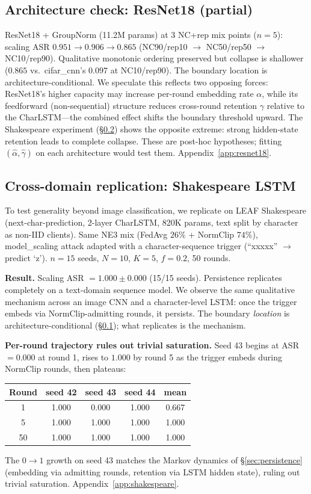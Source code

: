 \documentclass{article}
\begin{document}
\subsection{Architecture check: ResNet18 (partial)}
\label{sec:resnet18}

ResNet18 + GroupNorm (11.2M params) at 3 NC+rep mix points ($n=5$): scaling ASR $0.951 \to 0.906 \to 0.865$ (NC90/rep10 $\to$ NC50/rep50 $\to$ NC10/rep90). Qualitative monotonic ordering preserved but collapse is shallower ($0.865$ vs.\ cifar\_cnn's $0.097$ at NC10/rep90). The boundary location is architecture-conditional. We speculate this reflects two opposing forces: ResNet18's higher capacity may increase per-round embedding rate $\alpha$, while its feedforward (non-sequential) structure reduces cross-round retention $\gamma$ relative to the CharLSTM---the combined effect shifts the boundary threshold upward. The Shakespeare experiment (§\ref{sec:shakespeare}) shows the opposite extreme: strong hidden-state retention leads to complete collapse. These are post-hoc hypotheses; fitting $(\hat\alpha, \hat\gamma)$ on each architecture would test them. Appendix~\ref{app:resnet18}.

\subsection{Cross-domain replication: Shakespeare LSTM}
\label{sec:shakespeare}

To test generality beyond image classification, we replicate on LEAF Shakespeare (next-char-prediction, 2-layer CharLSTM, 820K params, text split by character as non-IID clients). Same NE3 mix (FedAvg $26\%$ + NormClip $74\%$), model\_scaling attack adapted with a character-sequence trigger (``xxxxx'' $\to$ predict `z'). $n=15$ seeds, $N{=}10$, $K{=}5$, $f{=}0.2$, 50 rounds.

\textbf{Result.} Scaling ASR $= 1.000 \pm 0.000$ (15/15 seeds). Persistence replicates completely on a text-domain sequence model. We observe the same qualitative mechanism across an image CNN and a character-level LSTM: once the trigger embeds via NormClip-admitting rounds, it persists. The boundary \emph{location} is architecture-conditional (§\ref{sec:resnet18}); what replicates is the mechanism.

\textbf{Per-round trajectory rules out trivial saturation.} Seed 43 begins at ASR $= 0.000$ at round 1, rises to $1.000$ by round 5 as the trigger embeds during NormClip rounds, then plateaus:
\begin{center}\small
\begin{tabular}{c|ccc|c}
\toprule
Round & seed 42 & seed 43 & seed 44 & mean \\
\midrule
1  & 1.000 & 0.000 & 1.000 & 0.667 \\
5  & 1.000 & 1.000 & 1.000 & 1.000 \\
50 & 1.000 & 1.000 & 1.000 & 1.000 \\
\bottomrule
\end{tabular}
\end{center}
The $0 \to 1$ growth on seed 43 matches the Markov dynamics of §\ref{sec:persistence} (embedding via admitting rounds, retention via LSTM hidden state), ruling out trivial saturation. Appendix~\ref{app:shakespeare}.
\end{document}
